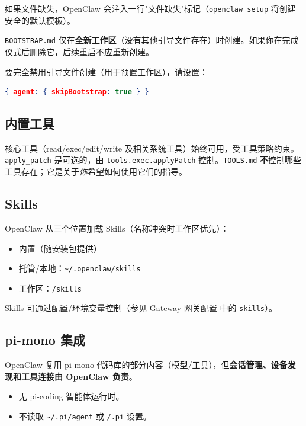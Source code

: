 如果文件缺失，OpenClaw 会注入一行"文件缺失"标记（\texttt{openclaw setup} 将创建安全的默认模板）。

\texttt{BOOTSTRAP.md} 仅在\textbf{全新工作区}（没有其他引导文件存在）时创建。如果你在完成仪式后删除它，后续重启不应重新创建。

要完全禁用引导文件创建（用于预置工作区），请设置：

\begin{lstlisting}[language=json]
{ agent: { skipBootstrap: true } }
\end{lstlisting}


\subsection{内置工具}


核心工具（read/exec/edit/write 及相关系统工具）始终可用，受工具策略约束。\texttt{apply\_patch} 是可选的，由 \texttt{tools.exec.applyPatch} 控制。\texttt{TOOLS.md} \textbf{不}控制哪些工具存在；它是关于\textit{你}希望如何使用它们的指导。

\subsection{Skills}


OpenClaw 从三个位置加载 Skills（名称冲突时工作区优先）：

\begin{itemize}
  \item 内置（随安装包提供）
  \item 托管/本地：\texttt{\textasciitilde{}/.openclaw/skills}
  \item 工作区：\texttt{/skills}
\end{itemize}


Skills 可通过配置/环境变量控制（参见 \href{/gateway/configuration}{Gateway 网关配置} 中的 \texttt{skills}）。

\subsection{pi-mono 集成}


OpenClaw 复用 pi-mono 代码库的部分内容（模型/工具），但\textbf{会话管理、设备发现和工具连接由 OpenClaw 负责}。

\begin{itemize}
  \item 无 pi-coding 智能体运行时。
  \item 不读取 \texttt{\textasciitilde{}/.pi/agent} 或 \texttt{/.pi} 设置。
\end{itemize}


